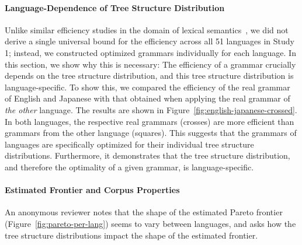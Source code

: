 \documentclass[10pt,twoside,lineno]{article}
\begin{document}
\paragraph{Language-Dependence of Tree Structure Distribution}
Unlike similar efficiency studies in the domain of lexical semantics~\cite{kemp2012kinship,regier2015word,zaslavsky2018efficient}, we did not derive a single universal bound for the efficiency across all 51 languages in Study 1; instead, we constructed optimized grammars individually for each language.
In this section, we show why this is necessary:
The efficiency of a grammar crucially depends on the tree structure distribution, and this tree structure distribution is language-specific.
To show this, we compared the efficiency of the real grammar of English and Japanese with that obtained when applying the real grammar of \emph{the other} language.
The results are shown in Figure~\ref{fig:english-japanese-crossed}.
In both languages, the respective real grammars (crosses) are more efficient than grammars from the other language (squares).
This suggests that the grammars of languages are specifically optimized for their individual tree structure distributions.
Furthermore, it demonstrates that the tree structure distribution, and therefore the optimality of a given grammar, is language-specific.





\paragraph{Estimated Frontier and Corpus Properties}
An anonymous reviewer notes that the shape of the estimated Pareto frontier (Figure~\ref{fig:pareto-per-lang}) seems to vary between languages, and asks how the tree structure distributions impact the shape of the estimated frontier.
\end{document}
